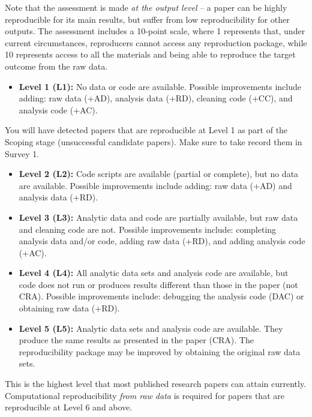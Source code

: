 \documentclass[
]{book}
\providecommand{\tightlist}{%
  \setlength{\itemsep}{0pt}\setlength{\parskip}{0pt}}
\begin{document}
Note that the assessment is made \emph{at the output level} -- a paper can be highly reproducible for its main results, but suffer from low reproducibility for other outputs. The assessment includes a 10-point scale, where 1 represents that, under current circumstances, reproducers cannot access any reproduction package, while 10 represents access to all the materials and being able to reproduce the target outcome from the raw data.

\begin{itemize}
\tightlist
\item
  \textbf{Level 1 (L1):} No data or code are available. Possible improvements include adding: raw data (+AD), analysis data (+RD), cleaning code (+CC), and analysis code (+AC).
\end{itemize}

You will have detected papers that are reproducible at Level 1 as part of the Scoping stage (unsuccessful candidate papers). Make sure to take record them in Survey 1.

\begin{itemize}
\item
  \textbf{Level 2 (L2):} Code scripts are available (partial or complete), but no data are available. Possible improvements include adding: raw data (+AD) and analysis data (+RD).
\item
  \textbf{Level 3 (L3):} Analytic data and code are partially available, but raw data and cleaning code are not. Possible improvements include: completing analysis data and/or code, adding raw data (+RD), and adding analysis code (+AC).
\item
  \textbf{Level 4 (L4):} All analytic data sets and analysis code are available, but code does not run or produces results different than those in the paper (not CRA). Possible improvements include: debugging the analysis code (DAC) or obtaining raw data (+RD).
\item
  \textbf{Level 5 (L5):} Analytic data sets and analysis code are available. They produce the same results as presented in the paper (CRA). The reproducibility package may be improved by obtaining the original raw data sets.
\end{itemize}

This is the highest level that most published research papers can attain currently. Computational reproducibility \emph{from raw data} is required for papers that are reproducible at Level 6 and above.
\end{document}
